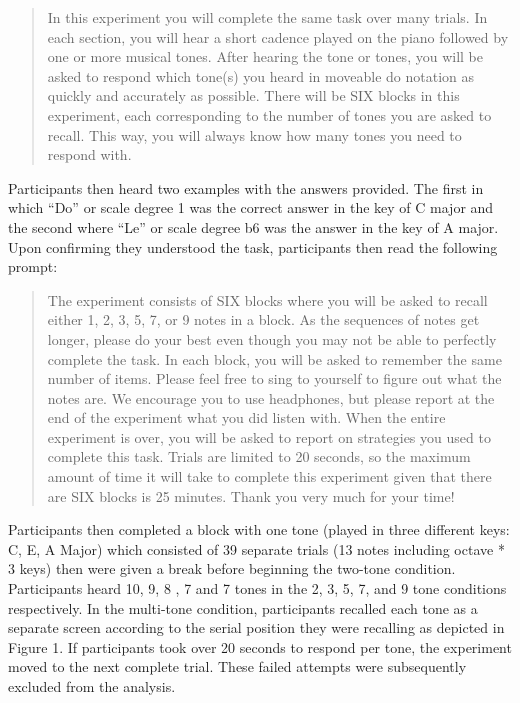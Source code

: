 \documentclass[english,man,floatsintext]{apa6}
\begin{document}
\begin{quote}
In this experiment you will complete the same task over many trials. In each section, you will hear a short cadence played on the piano followed by one or more musical tones. After hearing the tone or tones, you will be asked to respond which tone(s) you heard in moveable do notation as quickly and accurately as possible. There will be SIX blocks in this experiment, each corresponding to the number of tones you are asked to recall. This way, you will always know how many tones you need to respond with.
\end{quote}

Participants then heard two examples with the answers provided.
The first in which \enquote{Do} or scale degree 1 was the correct answer in the key of C major and the second where \enquote{Le} or scale degree b6 was the answer in the key of A major.
Upon confirming they understood the task, participants then read the following prompt:

\begin{quote}
The experiment consists of SIX blocks where you will be asked to recall either 1, 2, 3, 5, 7, or 9 notes in a block. As the sequences of notes get longer, please do your best even though you may not be able to perfectly complete the task. In each block, you will be asked to remember the same number of items. Please feel free to sing to yourself to figure out what the notes are. We encourage you to use headphones, but please report at the end of the experiment what you did listen with. When the entire experiment is over, you will be asked to report on strategies you used to complete this task. Trials are limited to 20 seconds, so the maximum amount of time it will take to complete this experiment given that there are SIX blocks is 25 minutes. Thank you very much for your time!
\end{quote}

Participants then completed a block with one tone (played in three different keys: C, E, A Major) which consisted of 39 separate trials (13 notes including octave * 3 keys) then were given a break before beginning the two-tone condition.
Participants heard 10, 9, 8 , 7 and 7 tones in the 2, 3, 5, 7, and 9 tone conditions respectively.
In the multi-tone condition, participants recalled each tone as a separate screen according to the serial position they were recalling as depicted in Figure 1.
If participants took over 20 seconds to respond per tone, the experiment moved to the next complete trial. These failed attempts were subsequently excluded from the analysis.
\end{document}
